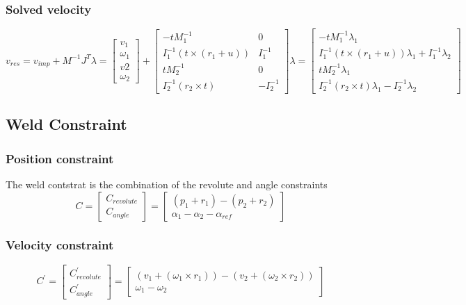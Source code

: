 \documentclass{article}
\begin{document}
	\subsubsection{Solved velocity}
		$$
			v_{res}=v_{imp}+M^{-1}J^T\lambda=
			\begin{bmatrix}
				v_1\\
				\omega_1\\
				v2\\
				\omega_2
			\end{bmatrix}
			+
			\begin{bmatrix}
				-tM_1^{-1}					& 0\\
				I_1^{-1}(t\times(r_1+u))	& I_1^{-1}\\
				tM_2^{-1}					& 0\\
				I_2^{-1}(r_2\times t)		& -I_2^{-1}
			\end{bmatrix}
			\lambda
			=
			\begin{bmatrix}
				-tM_1^{-1}\lambda_1\\
				I_1^{-1}(t\times(r_1+u))\lambda_1 + I_1^{-1}\lambda_2\\
				tM_2^{-1}\lambda_1\\
				I_2^{-1}(r_2\times t)\lambda_1 - I_2^{-1}\lambda_2
			\end{bmatrix}
		$$
	\newpage
	\subsection{Weld Constraint}
	\subsubsection{Position constraint}
	The weld contstrat is the combination of the revolute and angle constraints
		$$
			C=
			\begin{bmatrix}
				C_{revolute}\\
				C_{angle}
			\end{bmatrix}
			=
			\begin{bmatrix}
				(p_1+r_1)-(p_2+r_2)\\
				\alpha_1-\alpha_2-\alpha_{ref}
			\end{bmatrix}
		$$
	\subsubsection{Velocity constraint}
		$$
			C^{'}=
			\begin{bmatrix}
				C_{revolute}^{'}\\
				C_{angle}^{'}
			\end{bmatrix}
			=
			\begin{bmatrix}
				(v_1+(\omega_1\times r_1))-(v_2+(\omega_2\times r_2))\\
				\omega_1-\omega_2
			\end{bmatrix}
		$$
\end{document}

